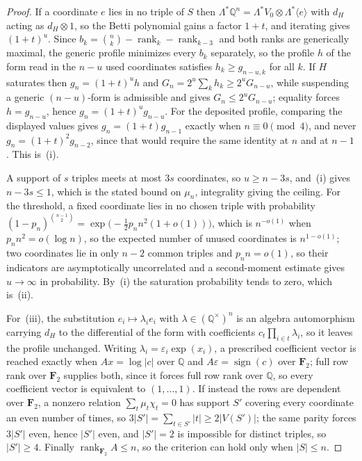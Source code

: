 \documentclass[11pt]{article}
\theoremstyle{definition}
\begin{document}
\begin{proof}
If a coordinate $e$ lies in no triple of $S$ then $\Lambda^{*}\mathbb Q^n=\Lambda^{*}V_0\otimes\Lambda^{*}\langle e\rangle$ with $d_H$ acting as $d_H\otimes1$, so the Betti polynomial gains a factor $1+t$, and iterating gives $(1+t)^{u}$.  Since $b_k=\binom nk-\operatorname{rank}_k-\operatorname{rank}_{k-3}$ and both ranks are generically maximal, the generic profile minimizes every $b_k$ separately, so the profile $h$ of the form read in the $n-u$ used coordinates satisfies $h_k\ge g_{n-u,k}$ for all $k$.  If $H$ saturates then $g_n=(1+t)^{u}h$ and $G_n=2^{u}\sum_kh_k\ge2^{u}G_{n-u}$, while suspending a generic $(n-u)$-form is admissible and gives $G_n\le2^{u}G_{n-u}$; equality forces $h=g_{n-u}$, hence $g_n=(1+t)^{u}g_{n-u}$.  For the deposited profile, comparing the displayed values gives $g_n=(1+t)g_{n-1}$ exactly when $n\equiv0\pmod4$, and never $g_n=(1+t)^2g_{n-2}$, since that would require the same identity at $n$ and at $n-1$.  This is~(i).

A support of $s$ triples meets at most $3s$ coordinates, so $u\ge n-3s$, and~(i) gives $n-3s\le1$, which is the stated bound on $\mu_n$, integrality giving the ceiling.  For the threshold, a fixed coordinate lies in no chosen triple with probability $(1-p_n)^{\binom{n-1}2}=\exp\bigl(-\tfrac12p_nn^2(1+o(1))\bigr)$, which is $n^{-o(1)}$ when $p_nn^2=o(\log n)$, so the expected number of unused coordinates is $n^{1-o(1)}$; two coordinates lie in only $n-2$ common triples and $p_nn=o(1)$, so their indicators are asymptotically uncorrelated and a second-moment estimate gives $u\to\infty$ in probability.  By~(i) the saturation probability tends to zero, which is~(ii).

For~(iii), the substitution $e_i\mapsto\lambda_ie_i$ with $\lambda\in(\mathbb Q^{\times})^n$ is an algebra automorphism carrying $d_H$ to the differential of the form with coefficients $c_t\prod_{i\in t}\lambda_i$, so it leaves the profile unchanged.  Writing $\lambda_i=\varepsilon_i\exp(x_i)$, a prescribed coefficient vector is reached exactly when $Ax=\log|c|$ over $\mathbb Q$ and $A\varepsilon=\operatorname{sign}(c)$ over $\mathbf F_2$; full row rank over $\mathbf F_2$ supplies both, since it forces full row rank over $\mathbb Q$, so every coefficient vector is equivalent to $(1,\ldots,1)$.  If instead the rows are dependent over $\mathbf F_2$, a nonzero relation $\sum_t\mu_t\chi_t=0$ has support $S'$ covering every coordinate an even number of times, so $3|S'|=\sum_{t\in S'}|t|\ge2|V(S')|$; the same parity forces $3|S'|$ even, hence $|S'|$ even, and $|S'|=2$ is impossible for distinct triples, so $|S'|\ge4$.  Finally $\operatorname{rank}_{\mathbf F_2}A\le n$, so the criterion can hold only when $|S|\le n$.
\end{proof}
\end{document}
